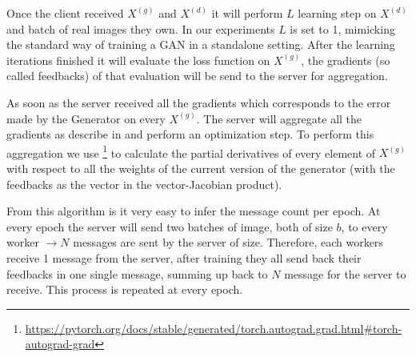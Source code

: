 Once the client received $X^{(g)}$ and $X^{(d)}$ it will perform $L$ learning step on $X^{(d)}$ and batch of real images they own. In our experiments $L$ is set to 1, mimicking the standard way of training a GAN in a standalone setting. After the learning iterations finished it will evaluate the loss function on $X^{(g)}$, the gradients (so called feedbacks) of that evaluation will be send to the server for aggregation.

As soon as the server received all the gradients which corresponds to the error made by the Generator on every $X^{(g)}$. The server will aggregate all the gradients as describe in \cite{mdgan} and perform an optimization step. To perform this aggregation we use \footnote{\url{https://pytorch.org/docs/stable/generated/torch.autograd.grad.html\#torch-autograd-grad}} to calculate the partial derivatives of every element of $X^{(g)}$ with respect to all the weights of the current version of the generator (with the feedbacks as the vector in the vector-Jacobian product).

From this algorithm is it very easy to infer the message count per epoch. At every epoch the server will send two batches of image, both of size $b$, to every worker $\rightarrow N$ messages are sent by the server of size. Therefore, each workers receive 1 message from the server, after training they all send back their feedbacks in one single message, summing up back to $N$ message for the server to receive. This process is repeated at every epoch.

